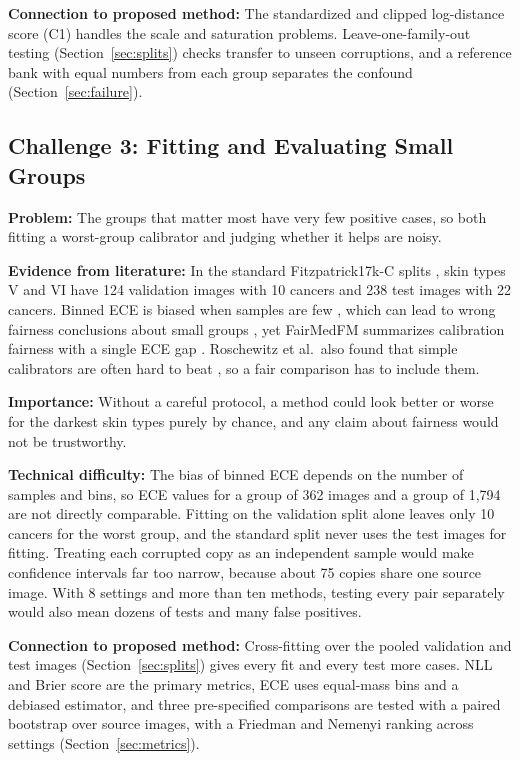 \documentclass[sigconf,nonacm]{acmart}
\begin{document}
\textbf{Connection to proposed method:} The standardized and clipped log-distance score (C1) handles the scale and saturation problems. Leave-one-family-out testing (Section~\ref{sec:splits}) checks transfer to unseen corruptions, and a reference bank with equal numbers from each group separates the confound (Section~\ref{sec:failure}).

\subsection{Challenge 3: Fitting and Evaluating Small Groups}
\label{sec:ch3}

\textbf{Problem:} The groups that matter most have very few positive cases, so both fitting a worst-group calibrator and judging whether it helps are noisy.

\textbf{Evidence from literature:} In the standard Fitzpatrick17k-C splits \cite{abhishek2025quality}, skin types V and VI have 124 validation images with 10 cancers and 238 test images with 22 cancers. Binned ECE is biased when samples are few \cite{kumar2019verified,roelofs2022mitigating}, which can lead to wrong fairness conclusions about small groups \cite{riccilara2023calibration}, yet FairMedFM summarizes calibration fairness with a single ECE gap \cite{jin2024fairmedfm}. Roschewitz et al.\ also found that simple calibrators are often hard to beat \cite{roschewitz2025where}, so a fair comparison has to include them.

\textbf{Importance:} Without a careful protocol, a method could look better or worse for the darkest skin types purely by chance, and any claim about fairness would not be trustworthy.

\textbf{Technical difficulty:} The bias of binned ECE depends on the number of samples and bins, so ECE values for a group of 362 images and a group of 1,794 are not directly comparable. Fitting on the validation split alone leaves only 10 cancers for the worst group, and the standard split never uses the test images for fitting. Treating each corrupted copy as an independent sample would make confidence intervals far too narrow, because about 75 copies share one source image. With 8 settings and more than ten methods, testing every pair separately would also mean dozens of tests and many false positives.

\textbf{Connection to proposed method:} Cross-fitting over the pooled validation and test images (Section~\ref{sec:splits}) gives every fit and every test more cases. NLL and Brier score are the primary metrics, ECE uses equal-mass bins and a debiased estimator, and three pre-specified comparisons are tested with a paired bootstrap over source images, with a Friedman and Nemenyi ranking across settings (Section~\ref{sec:metrics}).
\end{document}
